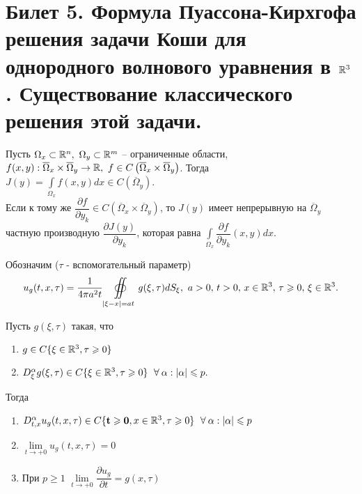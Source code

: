 \documentclass[../main.tex]{subfiles}
\begin{document}
\section{Билет 5. Формула Пуассона-Кирхгофа решения задачи Коши для однородного волнового уравнения в \texorpdfstring{$\mathbb{R}^3$}{R\textasciicircum 3}. Существование классического решения этой задачи.}
\begin{theorem}
Пусть $\Omega_x\subset\R^n,\ \Omega_y\subset\R^m$ -- ограниченные области, $f(x,y):\overline{\Omega}_x\times\overline{\Omega}_y\rightarrow \mathbb{R},\ f\in C\left(\overline{\Omega}_x\times\overline{\Omega}_y \right)$. Тогда $J(y)=\displaystyle\int\limits_{\Omega_x}f(x,y)dx\in C\left(\overline{\Omega}_y \right)$.\\
Если к тому же $\dfrac{\partial f}{\partial y_k}\in C\left(\overline{\Omega}_x\times\overline{\Omega}_y \right)$, то $J(y)$ имеет непрерывную на $\overline{\Omega}_y$ частную производную $\dfrac{\partial J(y)}{\partial y_k}$, которая равна $\displaystyle\int\limits_{\Omega_x}\dfrac{\partial f}{\partial y_k}(x,y)dx.$
\end{theorem}
Обозначим ($\tau$ - вспомогательный параметр)
\[
u_g(t,x,\tau)=\frac{1}{4\pi a^2t}\displaystyle\oiint\limits_{|\xi - x|=at}g(\xi ,\tau ) dS_{\xi},\ a>0,\, t> 0,\, x\in \R^3,\, \tau \geq 0,\, \xi\in\R^3.
\]
\begin{lemma}
Пусть $g(\xi, \tau )$ такая, что 
\begin{enumerate}
\item $g \in C\{\xi\in\mathbb{R}^3,\tau\geqslant 0 \}$
\item $D_{\xi}^{\alpha}g(\xi , \tau )\in C\{\xi\in\R^3,\tau\geq 0 \}\ \forall\alpha : |\alpha |\leq p.$
\end{enumerate}
Тогда
\begin{enumerate}
\item $D_{t,x}^{\alpha}u_g(t,x,\tau )\in C\{\mathbf{t\geq 0}, x\in\R^3,\tau\geq 0 \}\ \forall\alpha : |\alpha |\leq p$
\item $\lim\limits_{t\rightarrow +0}u_g(t,x,\tau )=0$
\item При $p\geq 1$ $\lim\limits_{t\rightarrow +0}\dfrac{\partial u_g}{\partial t}=g(x,\tau)$
\end{enumerate}
\end{lemma}
\end{document}
